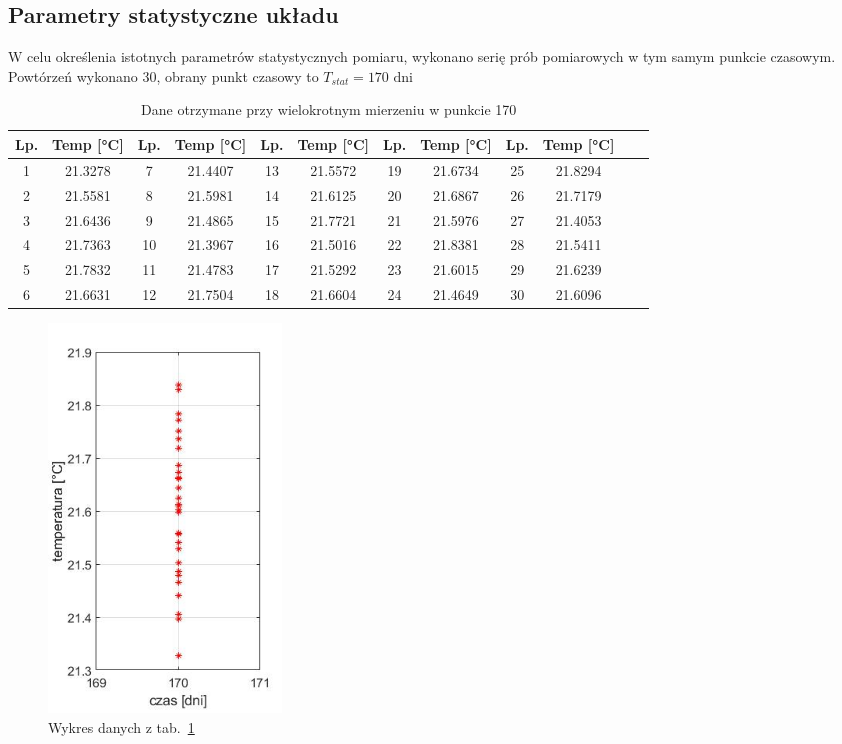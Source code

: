 \documentclass[a4paper, 12pt]{mwart}
\begin{document}
		\subsection{Parametry statystyczne układu} \label{subsec:stats}
			
			W celu określenia istotnych parametrów statystycznych pomiaru, wykonano serię prób pomiarowych
			w tym samym punkcie czasowym. Powtórzeń wykonano 30, obrany punkt czasowy to $ T_{stat} = 170 \text{ dni} $

			\begin{table}[h]
				\center
				\begin{tabular}{|c|c||c|c||c|c||c|c||c|c||c|c|}
					\hline
					Lp. & Temp [°C] & Lp. & Temp [°C] & Lp. & Temp [°C] & Lp. & Temp [°C] & Lp. & Temp [°C]\\ \hline \hline
					1 & 21.3278 & 7 & 21.4407 & 13 & 21.5572 & 19 & 21.6734 & 25 & 21.8294 \\ \hline
					2 & 21.5581 & 8 & 21.5981 & 14 & 21.6125 & 20 & 21.6867 & 26 & 21.7179 \\ \hline
					3 & 21.6436 & 9 & 21.4865 & 15 & 21.7721 & 21 & 21.5976 & 27 & 21.4053 \\ \hline
					4 & 21.7363 & 10 & 21.3967 & 16 & 21.5016 & 22 & 21.8381 & 28 & 21.5411 \\ \hline
					5 & 21.7832 & 11 & 21.4783 & 17 & 21.5292 & 23 & 21.6015 & 29 & 21.6239 \\ \hline
					6 & 21.6631 & 12 & 21.7504 & 18 & 21.6604 & 24 & 21.4649 & 30 & 21.6096 \\ \hline
				\end{tabular}
				\caption{Dane otrzymane przy wielokrotnym mierzeniu w punkcie 170}
				\label{tab:stat}
			\end{table}

			\begin{figure}	
				\begin{center}
					\includegraphics[width = 0.3\textwidth]{graphs/1C.jpg}
					\caption{Wykres danych z tab.~\ref{tab:stat}}
					\label{fig:stat}
				\end{center}
			\end{figure}
\end{document}

